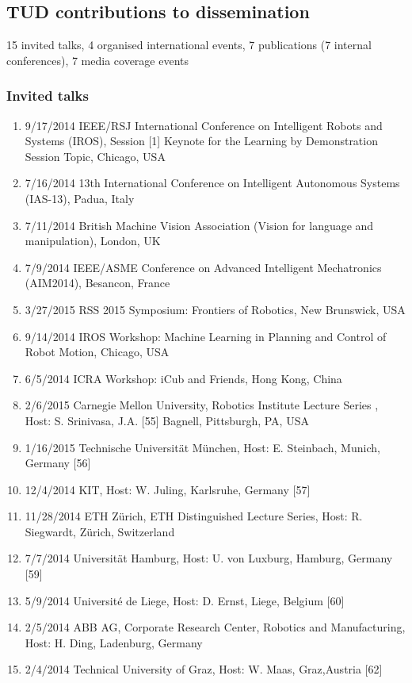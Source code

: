 \subsection{TUD contributions to dissemination}

15 invited talks, 4 organised international events, 7 publications (7 internal conferences), 7 media coverage events


\subsubsection{Invited talks}

\begin{enumerate}

\item 9/17/2014 IEEE/RSJ International Conference on Intelligent Robots and Systems (IROS), Session [1] Keynote for the Learning by Demonstration Session Topic, Chicago, USA
\item 7/16/2014 13th International Conference on Intelligent Autonomous Systems (IAS-13), Padua, Italy 
\item 7/11/2014 British Machine Vision Association (Vision for language and manipulation), London, UK
\item 7/9/2014 IEEE/ASME Conference on Advanced Intelligent Mechatronics (AIM2014), Besancon, France
\item 3/27/2015 RSS 2015 Symposium: Frontiers of Robotics, New Brunswick, USA 
\item 9/14/2014 IROS Workshop: Machine Learning in Planning and Control of Robot Motion, Chicago, USA
\item 6/5/2014 ICRA Workshop: iCub and Friends, Hong Kong, China
\item 2/6/2015 Carnegie Mellon University, Robotics Institute Lecture Series , Host: S. Srinivasa, J.A. [55] Bagnell, Pittsburgh, PA, USA
\item 1/16/2015 Technische Universität München, Host: E. Steinbach, Munich, Germany [56]
\item 12/4/2014	KIT, Host: W. Juling, Karlsruhe, Germany [57]
\item 11/28/2014	ETH Zürich, ETH Distinguished Lecture Series, Host: R. Siegwardt, Zürich, Switzerland
\item 7/7/2014 Universität Hamburg, Host: U. von Luxburg, Hamburg, Germany [59]
\item 5/9/2014 Université de Liege, Host: D. Ernst, Liege, Belgium [60]
\item 2/5/2014 ABB AG, Corporate Research Center, Robotics and Manufacturing, Host: H. Ding, Ladenburg, Germany
\item 2/4/2014 Technical University of Graz, Host: W. Maas, Graz,Austria [62]
\end{enumerate}


